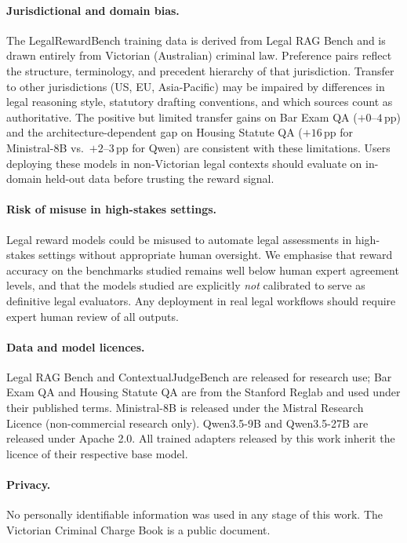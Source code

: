 \documentclass{article}
\theoremstyle{plain}
\theoremstyle{definition}
\theoremstyle{remark}
\begin{document}
\paragraph{Jurisdictional and domain bias.}
The LegalRewardBench training data is derived from Legal RAG Bench and is drawn entirely from Victorian (Australian) criminal law.  Preference pairs reflect the structure, terminology, and precedent hierarchy of that jurisdiction.  Transfer to other jurisdictions (US, EU, Asia-Pacific) may be impaired by differences in legal reasoning style, statutory drafting conventions, and which sources count as authoritative.  The positive but limited transfer gains on Bar Exam QA ($+0$--$4$\,pp) and the architecture-dependent gap on Housing Statute QA ($+16$\,pp for Ministral-8B vs.\ $+2$--$3$\,pp for Qwen) are consistent with these limitations.  Users deploying these models in non-Victorian legal contexts should evaluate on in-domain held-out data before trusting the reward signal.

\paragraph{Risk of misuse in high-stakes settings.}
Legal reward models could be misused to automate legal assessments in high-stakes settings without appropriate human oversight.  We emphasise that reward accuracy on the benchmarks studied remains well below human expert agreement levels, and that the models studied are explicitly \emph{not} calibrated to serve as definitive legal evaluators.  Any deployment in real legal workflows should require expert human review of all outputs.

\paragraph{Data and model licences.}
Legal RAG Bench \citep{butler2026legalragbenchendtoend} and ContextualJudgeBench \citep{xu-etal-2025-context} are released for research use; Bar Exam QA and Housing Statute QA \citep{Zheng_2025} are from the Stanford Reglab and used under their published terms.  Ministral-8B is released under the Mistral Research Licence (non-commercial research only).  Qwen3.5-9B and Qwen3.5-27B are released under Apache 2.0.  All trained adapters released by this work inherit the licence of their respective base model.

\paragraph{Privacy.}
No personally identifiable information was used in any stage of this work.  The Victorian Criminal Charge Book is a public document.
\end{document}
